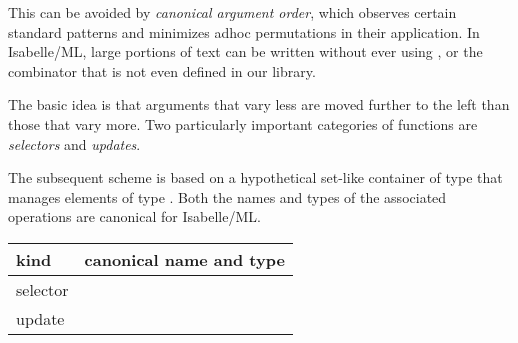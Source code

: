 \begin{isabellebody}
\begin{isamarkuptext}
  This can be avoided by \emph{canonical argument order}, which
  observes certain standard patterns and minimizes adhoc permutations
  in their application.  In Isabelle/ML, large portions of text can be
  written without ever using , or the
  combinator  that is not even
  defined in our library.

  \medskip The basic idea is that arguments that vary less are moved
  further to the left than those that vary more.  Two particularly
  important categories of functions are \emph{selectors} and
  \emph{updates}.

  The subsequent scheme is based on a hypothetical set-like container
  of type  that manages elements of type .  Both
  the names and types of the associated operations are canonical for
  Isabelle/ML.

  \medskip
  \begin{tabular}{ll}
  kind & canonical name and type \\\hline
  selector & \isa{member{\isaliteral{3A}{\isacharcolon}}\ {\isaliteral{5C3C626574613E}{\isasymbeta}}\ {\isaliteral{5C3C72696768746172726F773E}{\isasymrightarrow}}\ {\isaliteral{5C3C616C7068613E}{\isasymalpha}}\ {\isaliteral{5C3C72696768746172726F773E}{\isasymrightarrow}}\ bool} \\
  update & \isa{insert{\isaliteral{3A}{\isacharcolon}}\ {\isaliteral{5C3C616C7068613E}{\isasymalpha}}\ {\isaliteral{5C3C72696768746172726F773E}{\isasymrightarrow}}\ {\isaliteral{5C3C626574613E}{\isasymbeta}}\ {\isaliteral{5C3C72696768746172726F773E}{\isasymrightarrow}}\ {\isaliteral{5C3C626574613E}{\isasymbeta}}} \\
  \end{tabular}
  \medskip


\end{isamarkuptext}
\end{isabellebody}
